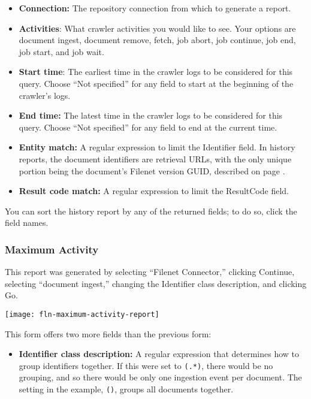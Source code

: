 \begin{changemargin}{1.5in}{0in}
\begin{itemize}

\item \textbf{Connection:} The repository connection from which to generate
a report.

\item \textbf{Activities}: What crawler activities you would like to
see.  Your options are document ingest, document remove, fetch, job
abort, job continue, job end, job start, and job wait.

\item \textbf{Start time}: The earliest time in the crawler logs to be
considered for this query.  Choose ``Not specified'' for any field to
start at the beginning of the crawler's logs.

\item \textbf{End time:} The latest time in the crawler logs to be
considered for this query. Choose ``Not specified'' for any field 
to end at the current time.

\item \textbf{Entity match:} A regular expression to limit the
Identifier field. In history reports, the document identifiers are
retrieval URLs, with the only unique portion being the document's
Filenet version GUID, described on page \pageref{docid}.

\item \textbf{Result code match:} A regular expression to limit the
ResultCode field.

\end{itemize}

You can sort the history report by any of the returned fields; to do so,
click the field names.

\subsubsection{Maximum Activity}

This report was generated by selecting ``Filenet Connector,'' clicking
Continue, selecting ``document ingest,'' changing the
Identifier class description, and clicking Go.

\texttt{[image: fln-maximum-activity-report]}

This form offers two more fields than the previous form:

\begin{itemize}

\item \textbf{Identifier class description:} A regular expression that
determines how to group identifiers together. If this were set to
\texttt{(.*)}, there would be no grouping, and so there would be only
one ingestion event per document. The setting in the example,
\texttt{()}, groups all documents together.


\end{itemize}
\end{changemargin}
